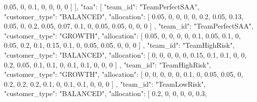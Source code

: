 {{                0.05,
                0,
                0.1,
                0,
                0,
                0,
                0
            ]
        }
    ],
    "taa": [
        {
            "team_id": "TeamPerfectSAA",
            "customer_type": "BALANCED",
            "allocation": [
                0.05,
                0,
                0,
                0,
                0,
                0.2,
                0.05,
                0.13,
                0.05,
                0,
                0.2,
                0.05,
                0.07,
                0.1,
                0,
                0.05,
                0.05,
                0,
                0,
                0
            ]
        },
        {
            "team_id": "TeamPerfectSAA",
            "customer_type": "GROWTH",
            "allocation": [
                0.05,
                0,
                0,
                0,
                0,
                0.1,
                0.05,
                0.1,
                0,
                0.05,
                0.2,
                0.1,
                0.15,
                0.1,
                0,
                0.05,
                0.05,
                0,
                0,
                0
            ]
        },
        {
            "team_id": "TeamHighRisk",
            "customer_type": "BALANCED",
            "allocation": [
                0,
                0,
                0,
                0,
                0,
                0.15,
                0.1,
                0.1,
                0,
                0,
                0.2,
                0.05,
                0.1,
                0.1,
                0,
                0.1,
                0.1,
                0,
                0,
                0
            ]
        },
        {
            "team_id": "TeamHighRisk",
            "customer_type": "GROWTH",
            "allocation": [
                0,
                0,
                0,
                0,
                0,
                0.1,
                0,
                0.05,
                0.05,
                0,
                0.2,
                0.2,
                0.2,
                0.1,
                0,
                0.1,
                0.1,
                0,
                0,
                0
            ]
        },
        {
            "team_id": "TeamLowRisk",
            "customer_type": "BALANCED",
            "allocation": [
                0.2,
                0,
                0,
                0,
                0,
                0.3,
}}
